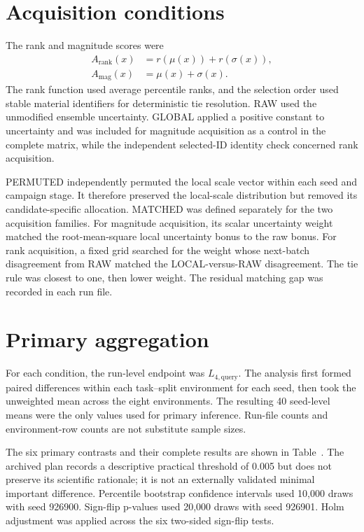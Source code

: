 \documentclass[11pt]{article}
\newcommand{\Lfourq}{\ensuremath{L_{4,\mathrm{query}}}\xspace}
\begin{document}
\section{Acquisition conditions}
The rank and magnitude scores were
\begin{align}
 A_{\mathrm{rank}}(x)&=r(\mu(x))+r(\sigma(x)),\\
 A_{\mathrm{mag}}(x)&=\mu(x)+\sigma(x).
\end{align}
The rank function used average percentile ranks, and the selection order used stable material identifiers for deterministic tie resolution. RAW used the unmodified ensemble uncertainty. GLOBAL applied a positive constant to uncertainty and was included for magnitude acquisition as a control in the complete matrix, while the independent selected-ID identity check concerned rank acquisition.

PERMUTED independently permuted the local scale vector within each seed and campaign stage. It therefore preserved the local-scale distribution but removed its candidate-specific allocation. MATCHED was defined separately for the two acquisition families. For magnitude acquisition, its scalar uncertainty weight matched the root-mean-square local uncertainty bonus to the raw bonus. For rank acquisition, a fixed grid searched for the weight whose next-batch disagreement from RAW matched the LOCAL-versus-RAW disagreement. The tie rule was closest to one, then lower weight. The residual matching gap was recorded in each run file.

\section{Primary aggregation}
For each condition, the run-level endpoint was \Lfourq. The analysis first formed paired differences within each task--split environment for each seed, then took the unweighted mean across the eight environments. The resulting 40 seed-level means were the only values used for primary inference. Run-file counts and environment-row counts are not substitute sample sizes.

The six primary contrasts and their complete results are shown in Table~. The archived plan records a descriptive practical threshold of 0.005 but does not preserve its scientific rationale; it is not an externally validated minimal important difference. Percentile bootstrap confidence intervals used 10,000 draws with seed 926900. Sign-flip p-values used 20,000 draws with seed 926901. Holm adjustment was applied across the six two-sided sign-flip tests.
\end{document}
